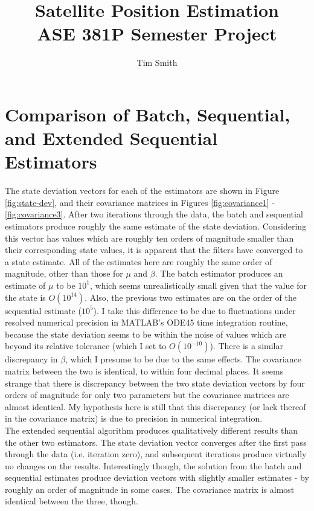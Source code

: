 \documentclass[a4paper,11pt]{article}
\title{\vspace{-4ex} Satellite Position Estimation \\ ASE 381P Semester Project}
\author{Tim Smith}
\date{\vspace{-3ex}}
\begin{document}
\newcommand{\pderiv}[3][]{%
  \ensuremath{\frac{\partial^{#1} {#2}}{\partial {#3}^{#1}}}}
\newcommand{\red}[1]{\textcolor{red}{#1}}

\lstset{language=Matlab,
  basicstyle=\footnotesize}

\maketitle

\section{Comparison of Batch, Sequential, and Extended Sequential Estimators}
\label{original}

  The state deviation vectors for each of the estimators are shown in Figure \ref{fig:state-dev}, and their covariance matrices in Figures \ref{fig:covariance1} - \ref{fig:covariance3}. After two iterations through the data, the batch and sequential estimators produce roughly the same estimate of the state deviation. Considering this vector has values which are roughly ten orders of magnitude smaller than their corresponding state values, it is apparent that the filters have converged to a state estimate. All of the estimates here are roughly the same order of magnitude, other than those for $\mu$ and $\beta$. The batch estimator produces an estimate of $\mu$ to be $10^1$, which seems unrealistically small given that the value for the state is $O(10^{14})$. Also, the previous two estimates are on the order of the sequential estimate ($10^5$). I take this difference to be due to fluctuations under resolved numerical precision in MATLAB's ODE45 time integration routine, because the state deviation seems to be within the noise of values which are beyond its relative tolerance (which I set to $O(10^{-10})$). There is a similar discrepancy in $\beta$, which I presume to be due to the same effects. The covariance matrix between the two is identical, to within four decimal places. It seems strange that there is discrepancy between the two state deviation vectors by four orders of magnitude for only two parameters but the covariance matrices are almost identical. My hypothesis here is still that this discrepancy (or lack thereof in the covariance matrix) is due to precision in numerical integration. \\

  The extended sequential algorithm produces qualitatively different results than the other two estimators. The state deviation vector converges after the first pass through the data (i.e. iteration zero), and subsequent iterations produce virtually no changes on the results. Interestingly though, the solution from the batch and sequential estimates produce deviation vectors with slightly smaller estimates - by roughly an order of magnitude in some cases. The covariance matrix is almost identical between the three, though. \\
\end{document}

